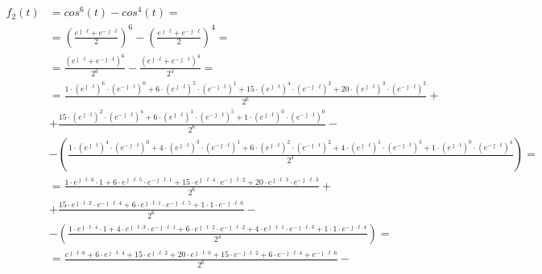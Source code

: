 \begin{task}
\begin{align*}
f_{2}(t)&=cos^6(t)-cos^4(t)= \\
&=\left( \frac{e^{\jmath \cdot t} + e^{-\jmath \cdot t}}{2} \right)^6 - \left( \frac{e^{\jmath \cdot t} + e^{-\jmath \cdot t}}{2} \right)^4= \\
&=\frac{\left(e^{\jmath \cdot t} + e^{-\jmath \cdot t}\right)^6}{2^6}-\frac{\left(e^{\jmath \cdot t} + e^{-\jmath \cdot t}\right)^4}{2^4}=\\
&=\frac{1 \cdot (e^{\jmath \cdot t})^6 \cdot (e^{-\jmath \cdot t})^0 + 6 \cdot (e^{\jmath \cdot t})^5 \cdot (e^{-\jmath \cdot t})^1 + 15 \cdot (e^{\jmath \cdot t})^4 \cdot (e^{-\jmath \cdot t})^2 + 20 \cdot (e^{\jmath \cdot t})^3 \cdot (e^{-\jmath \cdot t})^3}{2^6} + \\
&+\frac{15 \cdot (e^{\jmath \cdot t})^2 \cdot (e^{-\jmath \cdot t})^4 + 6 \cdot (e^{\jmath \cdot t})^1 \cdot (e^{-\jmath \cdot t})^5 +1 \cdot (e^{\jmath \cdot t})^0 \cdot (e^{-\jmath \cdot t})^6}{2^6} - \\
&-\left(\frac{1 \cdot (e^{\jmath \cdot t})^4 \cdot (e^{-\jmath \cdot t})^0 + 4 \cdot (e^{\jmath \cdot t})^3 \cdot (e^{-\jmath \cdot t})^1 + 6 \cdot (e^{\jmath \cdot t})^2 \cdot (e^{-\jmath \cdot t})^2 + 4 \cdot (e^{\jmath \cdot t})^1 \cdot (e^{-\jmath \cdot t})^3 + 1 \cdot (e^{\jmath \cdot t})^0 \cdot (e^{-\jmath \cdot t})^4}{2^4}\right)=\\
&=\frac{1 \cdot e^{\jmath \cdot t \cdot 6} \cdot 1 + 6 \cdot e^{\jmath \cdot t \cdot 5} \cdot e^{-\jmath \cdot t \cdot 1} + 15 \cdot e^{\jmath \cdot t \cdot 4} \cdot e^{-\jmath \cdot t \cdot 2} + 20 \cdot e^{\jmath \cdot t \cdot 3} \cdot e^{-\jmath \cdot t \cdot 3}}{2^6} + \\
&+\frac{15 \cdot e^{\jmath \cdot t \cdot 2} \cdot e^{-\jmath \cdot t \cdot 4} + 6 \cdot e^{\jmath \cdot t \cdot 1} \cdot e^{-\jmath \cdot t \cdot 5} + 1 \cdot 1 \cdot e^{-\jmath \cdot t \cdot 6}}{2^6} - \\
&-\left(\frac{1 \cdot e^{\jmath \cdot t \cdot 4} \cdot 1 + 4 \cdot e^{\jmath \cdot t \cdot 3} \cdot e^{-\jmath \cdot t \cdot 1} + 6 \cdot e^{\jmath \cdot t \cdot 2} \cdot e^{-\jmath \cdot t \cdot 2} + 4 \cdot e^{\jmath \cdot t \cdot 1} \cdot e^{-\jmath \cdot t \cdot 3} + 1 \cdot 1 \cdot e^{-\jmath \cdot t \cdot 4}}{2^4}\right)=\\
&=\frac{e^{\jmath \cdot t \cdot 6} + 6 \cdot e^{\jmath \cdot t \cdot 4}  + 15 \cdot e^{\jmath \cdot t \cdot 2} + 20 \cdot e^{\jmath \cdot t \cdot 0} + 15 \cdot e^{-\jmath \cdot t \cdot 2} + 6 \cdot e^{-\jmath \cdot t \cdot 4} + e^{-\jmath \cdot t \cdot 6}}{2^6} - \\

\end{align*}
\end{task}
